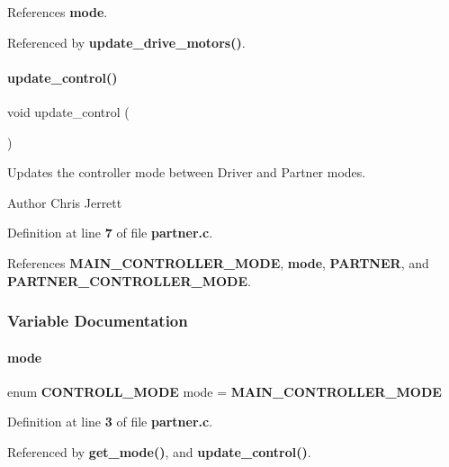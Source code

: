 References \textbf{ mode}.



Referenced by \textbf{ update\+\_\+drive\+\_\+motors()}.

\mbox{\label{partner_8c_ab2c78903a76d2ed8969271803c78368a}} 
\paragraph{update\+\_\+control()}
{\footnotesize\ttfamily void update\+\_\+control (\begin{DoxyParamCaption}{ }\end{DoxyParamCaption})}



Updates the controller mode between Driver and Partner modes. 

\begin{DoxyAuthor}{Author}
Chris Jerrett 
\end{DoxyAuthor}


Definition at line \textbf{ 7} of file \textbf{ partner.\+c}.



References \textbf{ M\+A\+I\+N\+\_\+\+C\+O\+N\+T\+R\+O\+L\+L\+E\+R\+\_\+\+M\+O\+DE}, \textbf{ mode}, \textbf{ P\+A\+R\+T\+N\+ER}, and \textbf{ P\+A\+R\+T\+N\+E\+R\+\_\+\+C\+O\+N\+T\+R\+O\+L\+L\+E\+R\+\_\+\+M\+O\+DE}.



\subsubsection{Variable Documentation}
\mbox{\label{partner_8c_ac57f7e8cb1c4e638c8c477740314a109}} 
\paragraph{mode}
{\footnotesize\ttfamily enum \textbf{ C\+O\+N\+T\+R\+O\+L\+L\+\_\+\+M\+O\+DE} mode = \textbf{ M\+A\+I\+N\+\_\+\+C\+O\+N\+T\+R\+O\+L\+L\+E\+R\+\_\+\+M\+O\+DE}\hspace{0.3cm}{\ttfamily [static]}}



Definition at line \textbf{ 3} of file \textbf{ partner.\+c}.



Referenced by \textbf{ get\+\_\+mode()}, and \textbf{ update\+\_\+control()}.

